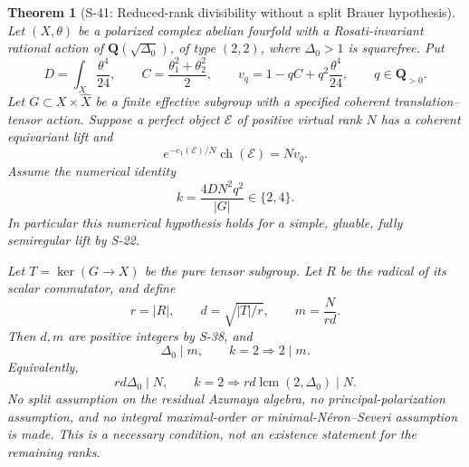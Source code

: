 \documentclass[11pt,a4paper]{article}
\newtheorem{theorem}{Theorem}[section]
\theoremstyle{definition}
\begin{document}
\begin{theorem}[S-41: Reduced-rank divisibility without a split Brauer hypothesis]
\label{thm:semireg-reduced-rank-brauer-cover}
Let \((X,\theta)\) be a polarized complex abelian fourfold with a Rosati-invariant rational action of \(\mathbf Q(\sqrt{\Delta_0})\), of type \((2,2)\), where \(\Delta_0>1\) is squarefree. Put \[
 D=\int_X\frac{\theta^4}{24},\qquad
 C=\frac{\theta_1^2+\theta_2^2}{2},\qquad
 v_q=1-qC+q^2\frac{\theta^4}{24},\qquad q\in\mathbf Q_{>0}.
\] Let \(G\subset X\times\widehat X\) be a finite effective subgroup with a specified coherent translation--tensor action. Suppose a perfect object \(\mathcal E\) of positive virtual rank \(N\) has a coherent equivariant lift and \[
 e^{-c_1(\mathcal E)/N}\operatorname{ch}(\mathcal E)=Nv_q.
 \tag{S41.1}
\] Assume the numerical identity \[
 k=\frac{4DN^2q^2}{|G|}\in\{2,4\}.
 \tag{S41.2}
\] In particular this numerical hypothesis holds for a simple, gluable, fully semiregular lift by S-22.

Let \(T=\ker(G\to X)\) be the pure tensor subgroup. Let \(R\) be the radical of its scalar commutator, and define \[
 r=|R|,\qquad d=\sqrt{|T|/r},\qquad
 m=\frac{N}{rd}.
 \tag{S41.3}
\] Then \(d,m\) are positive integers by S-38, and \[
 \boxed{\Delta_0\mid m,\qquad k=2\Longrightarrow2\mid m.}
 \tag{S41.4}
\] Equivalently, \[
 rd\Delta_0\mid N,\qquad
 k=2\Longrightarrow rd\operatorname{lcm}(2,\Delta_0)\mid N.
 \tag{S41.5}
\] No split assumption on the residual Azumaya algebra, no principal-polarization assumption, and no integral maximal-order or minimal-Néron--Severi assumption is made. This is a necessary condition, not an existence statement for the remaining ranks.
\end{theorem}
\end{document}

